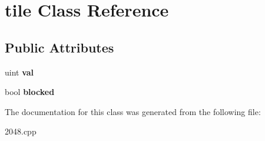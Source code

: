 \hypertarget{classtile}{}\section{tile Class Reference}
\label{classtile}
\subsection*{Public Attributes}
\begin{DoxyCompactItemize}
\item 
\hypertarget{classtile_a443bb9ca71af68c5bfdb1b4d3847b860}{}\label{classtile_a443bb9ca71af68c5bfdb1b4d3847b860} 
uint {\bfseries val}
\item 
\hypertarget{classtile_af564463c817e9743b708912a3efaac5e}{}\label{classtile_af564463c817e9743b708912a3efaac5e} 
bool {\bfseries blocked}
\end{DoxyCompactItemize}


The documentation for this class was generated from the following file\+:\begin{DoxyCompactItemize}
\item 
2048.\+cpp\end{DoxyCompactItemize}
